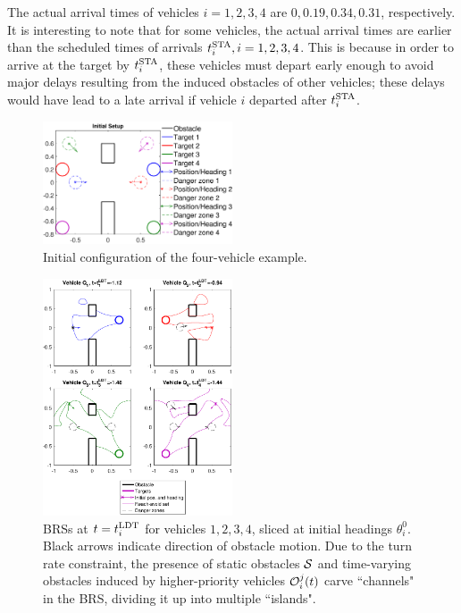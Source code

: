 The actual arrival times of vehicles $i=1,2,3,4$ are $0, 0.19, 0.34, 0.31$, respectively. It is interesting to note that for some vehicles, the actual arrival times are earlier than the scheduled times of arrivals $t^\text{STA}_i, i=1,2,3,4$. This is because in order to arrive at the target by $t^\text{STA}_i$, these vehicles must depart early enough to avoid major delays resulting from the induced obstacles of other vehicles; these delays would have lead to a late arrival if vehicle $i$ departed after $t^\text{STA}_i$.

\begin{figure}
	\centering
	\includegraphics[width=0.5\textwidth]{"fig/dubins_ic"}
	\caption{Initial configuration of the four-vehicle example.}
	\label{fig:dubins_ic}
\end{figure}

\begin{figure}
	\centering
	\includegraphics[width=0.5\textwidth]{"fig/dubins_reach_all"}
	\caption{BRSs at $t=t^\text{LDT}_i$ for vehicles $1,2,3,4$, sliced at initial headings $\theta_i^0$. Black arrows indicate direction of obstacle motion. Due to the turn rate constraint, the presence of static obstacles $\mathcal{S}$ and time-varying obstacles induced by higher-priority vehicles $\mathcal{O}_i^j(t)$ carve ``channels" in the BRS, dividing it up into multiple ``islands".}
	\label{fig:dubins_reach_all}
\end{figure}

